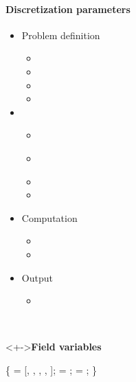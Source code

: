 
\begin{frame}[fragile] 
\secframetitle{\ssParameters}
\framesubtitle{Discretization parameters}
\vspace{-0.2in}
\begin{minipage}[t]{1.7in}
\begin{itemize}
\item Problem definition
  \begin{itemize}
  \item {}
  \item {}
  \item {}
  \item {}
  \end{itemize}
\item {}
  \begin{itemize}
  \item \textcolor{green!50!black}{}
  \item \textcolor{green!50!black}{}
  \item {}
  \item {}
  \end{itemize}
\item Computation
  \begin{itemize}
  \item {}
  \item {}
  \end{itemize}
\item Output
  \begin{itemize}
    \item {}
  \end{itemize}
\end{itemize}
\end{minipage} \
\begin{minipage}[t]{2.6in}
\vspace{-0.2in}
  \begin{block}<+->{\textbf{Field variables}}
  \footnotesize \vspace{-0.1in}
\begin{semiverbatim}
 \{
    = [,
           ,
           ,
           ,
           ];
    = ;
    = ;    
\}
\end{semiverbatim}
\end{block}
\end{minipage}
\end{frame}
  

